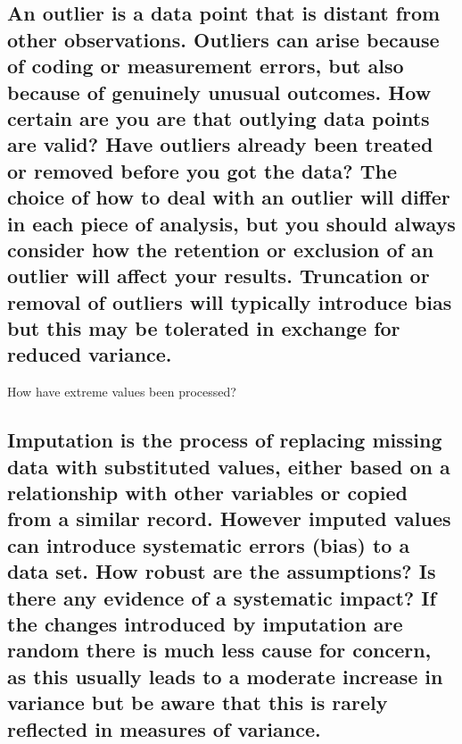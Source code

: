 \documentclass[]{book}
\begin{document}
\subsection{An outlier is a data point that is distant from other
observations. Outliers can arise because of coding or measurement
errors, but also because of genuinely unusual outcomes. How certain are
you are that outlying data points are valid? Have outliers already been
treated or removed before you got the data? The choice of how to deal
with an outlier will differ in each piece of analysis, but you should
always consider how the retention or exclusion of an outlier will affect
your results. Truncation or removal of outliers will typically introduce
bias but this may be tolerated in exchange for reduced
variance.}\label{an-outlier-is-a-data-point-that-is-distant-from-other-observations.-outliers-can-arise-because-of-coding-or-measurement-errors-but-also-because-of-genuinely-unusual-outcomes.-how-certain-are-you-are-that-outlying-data-points-are-valid-have-outliers-already-been-treated-or-removed-before-you-got-the-data-the-choice-of-how-to-deal-with-an-outlier-will-differ-in-each-piece-of-analysis-but-you-should-always-consider-how-the-retention-or-exclusion-of-an-outlier-will-affect-your-results.-truncation-or-removal-of-outliers-will-typically-introduce-bias-but-this-may-be-tolerated-in-exchange-for-reduced-variance.}

 How have extreme values been processed?

\subsection{Imputation is the process of replacing missing data with
substituted values, either based on a relationship with other variables
or copied from a similar record. However imputed values can introduce
systematic errors (bias) to a data set. How robust are the assumptions?
Is there any evidence of a systematic impact? If the changes introduced
by imputation are random there is much less cause for concern, as this
usually leads to a moderate increase in variance but be aware that this
is rarely reflected in measures of
variance.}\label{imputation-is-the-process-of-replacing-missing-data-with-substituted-values-either-based-on-a-relationship-with-other-variables-or-copied-from-a-similar-record.-however-imputed-values-can-introduce-systematic-errors-bias-to-a-data-set.-how-robust-are-the-assumptions-is-there-any-evidence-of-a-systematic-impact-if-the-changes-introduced-by-imputation-are-random-there-is-much-less-cause-for-concern-as-this-usually-leads-to-a-moderate-increase-in-variance-but-be-aware-that-this-is-rarely-reflected-in-measures-of-variance.}
\end{document}
